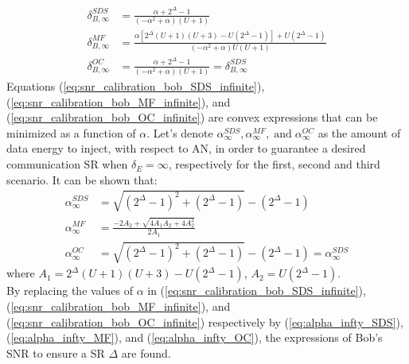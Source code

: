 \documentclass[journal,comsoc]{IEEEtran}
\begin{document}
\begin{align}
\delta_{B,\infty}^{SDS} &= \frac{\alpha + 2^\Delta - 1}{(-\alpha^2 + \alpha)(U+1)}
\label{eq:snr_calibration_bob_SDS_infinite} \\
\delta_{B,\infty}^{MF} &= \frac{\alpha\left[  2^\Delta(U+1)(U+3) - U(2^\Delta-1)  \right] + U(2^\Delta-1)}{(-\alpha^2 + \alpha)U(U+1)} 
\label{eq:snr_calibration_bob_MF_infinite}\\
\delta_{B,\infty}^{OC} &= \frac{\alpha + 2^\Delta - 1}{(-\alpha^2 + \alpha)(U+1)} = \delta_{B,\infty}^{SDS}
\label{eq:snr_calibration_bob_OC_infinite}
\end{align}
Equations  (\ref{eq:snr_calibration_bob_SDS_infinite}), (\ref{eq:snr_calibration_bob_MF_infinite}), and (\ref{eq:snr_calibration_bob_OC_infinite}) are convex expressions that can be minimized as a function of $\alpha$. Let's denote $\alpha_{\infty}^{SDS}, \alpha_{\infty}^{MF}, \; \text{and}\; \alpha_{\infty}^{OC}$ as the amount of data energy to inject, with respect to AN, in order to guarantee a desired communication SR when $\delta_E = \infty$, respectively for the first, second and third scenario. It can be shown that:
\begin{align}
	\alpha_{\infty}^{SDS} &= \sqrt{(2^\Delta -1)^2 + (2^\Delta -1)} - (2^\Delta -1)
	\label{eq:alpha_infty_SDS} \\
	\alpha_{\infty}^{MF} &= \frac{-2A_2+\sqrt{4A_1A_2 + 4A_2^2}}{2A_1} 
	\label{eq:alpha_infty_MF} \\
	\alpha_{\infty}^{OC} &= \sqrt{(2^\Delta -1)^2 + (2^\Delta -1)} - (2^\Delta -1) = \alpha_{\infty}^{SDS}
	\label{eq:alpha_infty_OC}
\end{align}
where $A_1 = 2^\Delta(U+1)(U+3)-U(2^\Delta-1)$, $A_2 = U(2^\Delta-1)$.\\
By replacing the values of $\alpha$ in (\ref{eq:snr_calibration_bob_SDS_infinite}), (\ref{eq:snr_calibration_bob_MF_infinite}), and (\ref{eq:snr_calibration_bob_OC_infinite}) respectively by (\ref{eq:alpha_infty_SDS}), (\ref{eq:alpha_infty_MF}), and (\ref{eq:alpha_infty_OC}), the expressions of Bob's SNR to ensure a SR $\Delta$ are found.









\end{document}
